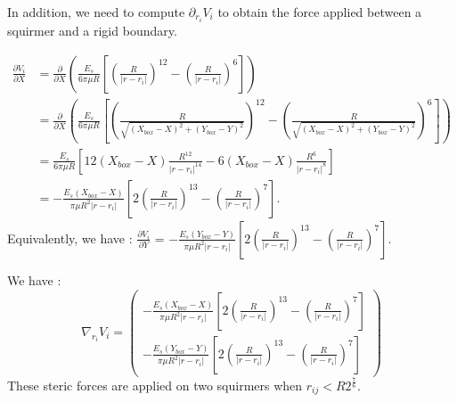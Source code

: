 \documentclass{article}
\begin{document}
\vspace{0,5cm}

In addition, we need to compute $\partial_{r_i} V_i$ to obtain the force applied between a squirmer and a rigid boundary.

\begin{align*}
    \frac{\partial V_i}{\partial X} &= \frac{\partial}{\partial X} \left( \frac{E_s}{6\pi\mu R} \left[ \left( \frac{R}{\lvert r - r_i \rvert} \right)^{12} - \left( \frac{R}{\lvert r - r_i \rvert} \right) ^6 \right] \right) \\
    &= \frac{\partial}{\partial X} \left( \frac{E_s}{6\pi\mu R} \left[ \left( \frac{R}{\sqrt{( X_{box}-X)^2 + (Y_{box}-Y)^2}} \right)^{12} - \left( \frac{R}{\sqrt{( X_{box}-X)^2 + (Y_{box}-Y)^2}} \right) ^6 \right] \right) \\
    &= \frac{E_s}{6\pi\mu R}\left[ 12(X_{box}-X)\frac{R^{12}}{\lvert r - r_i\rvert^{14}} - 6(X_{box}-X)\frac{R^6}{\lvert r-r_i\rvert^8} \right] \\
    &= -\frac{E_s (X_{box}-X)}{\pi\mu R^2 \lvert r - r_i \rvert } \left[ 2 \left( \frac{R}{\lvert r-r_i\rvert} \right)^{13} - \left( \frac{R}{\lvert r-r_i\rvert}\right)^7 \right].
\end{align*}
Equivalently, we have : $\frac{\partial V_i}{\partial Y}$ = $ - \frac{E_s (Y_{box}-Y)}{\pi\mu R^2 \lvert r - r_i \rvert } \left[ 2 \left( \frac{R}{\lvert r-r_i\rvert} \right)^{13} - \left( \frac{R}{\lvert r-r_i\rvert}\right)^7 \right].$

We have : 
\begin{equation*}
    \boxed{\nabla_{r_i} V_i = \begin{pmatrix}
        - \frac{E_s (X_{box}-X)}{\pi\mu R^2 \lvert r - r_i \rvert } \left[ 2 \left( \frac{R}{\lvert r-r_i\rvert} \right)^{13} - \left( \frac{R}{\lvert r-r_i\rvert}\right)^7 \right] \\
        - \frac{E_s (Y_{box}-Y)}{\pi\mu R^2 \lvert r - r_i \rvert } \left[ 2 \left( \frac{R}{\lvert r-r_i\rvert} \right)^{13} - \left( \frac{R}{\lvert r-r_i\rvert}\right)^7 \right]
    \end{pmatrix}}
\end{equation*}
These steric forces are applied on two squirmers when $r_{ij} < R2^{\frac{7}{6}}$.
\end{document}
